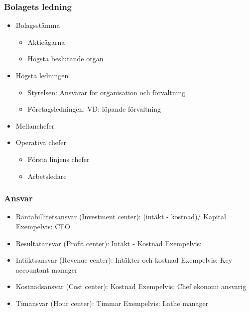 \begin{multicols}{2}
\subsubsection{Bolagets ledning}
\begin{itemize}
    \item Bolagsstämma 
    \begin{itemize}
        \item Aktieägarna
        \item Högsta beslutande organ
    \end{itemize}
    \item Högsta ledningen
    \begin{itemize}
        \item Styrelsen: \newline
        Ansvarar för organisation och förvaltning
        \item Företagsledningen: \newline
        VD: löpande förvaltning
    \end{itemize}
    \item Mellanchefer
    \item Operativa chefer
    \begin{itemize}
        \item Första linjens chefer 
        \item Arbetsledare
    \end{itemize}
\end{itemize}

\subsubsection{Ansvar}
\begin{itemize}
    \item Räntabillitetsansvar (Investment center): (intäkt - kostnad)/ Kapital \newline
    Exempelvis: CEO
    \item Resultatansvar (Profit center): Intäkt - Kostnad \newline
    Exempelvis: 
    \item Intäktsansvar (Revenue center): Intäkter och kostnad \newline
    Exempelvis: Key accountant manager
    \item Kostnadsansvar (Cost center): Kostnad  \newline
    Exempelvis: Chef ekonomi ansvarig
    \item Timansvar (Hour center): Timmar \newline
    Exempelvis: Lathe manager
\end{itemize}
\end{multicols}
\raggedcolumns


